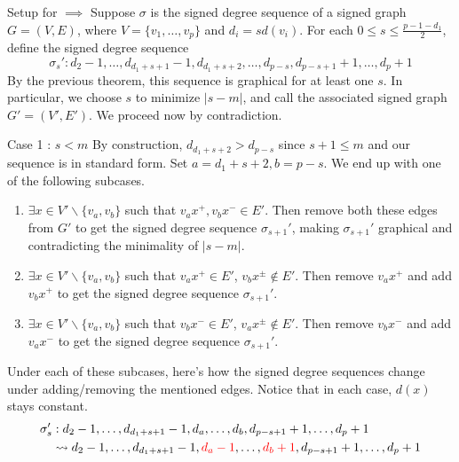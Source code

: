 \begin{frame}{Setup for $\implies$}
	Suppose $\sigma$ is the signed degree sequence of a signed graph $G = (V,E)$, where $V = \{v_1,\dots,v_p\}$ and $d_i = sd(v_i)$. For each $0 \leq s \leq \frac{p-1-d_1}{2}$, define the signed degree sequence
	\begin{equation*}
		\sigma_s' : d_2-1,\dots,d_{d_1+s+1}-1,d_{d_1+s+2},\dots,d_{p-s},d_{p-s+1}+1,\dots,d_p+1
	\end{equation*}
	By the previous theorem, this sequence is graphical for at least one $s$. In particular, we choose $s$ to minimize $|s-m|$, and call the associated signed graph $G' = (V',E')$. We proceed now by contradiction.
\end{frame}

\begin{frame}{Case 1 : $s < m$}
	By construction, $d_{d_1+s+2} > d_{p-s}$ since $s+1 \leq m$ and our sequence is in standard form. Set $a = d_1+s+2, b = p - s$. We end up with one of the following subcases.
	\begin{enumerate}
		\item $\exists x \in V'\backslash\{v_a,v_b\}$ such that $v_ax^{+}, v_bx^{-} \in E'$. Then remove both these edges from $G'$ to get the signed degree sequence $\sigma_{s+1}'$, making $\sigma_{s+1}'$ graphical and contradicting the minimality of $|s - m|$.
		\item $\exists x \in V'\backslash\{v_a,v_b\}$ such that $v_ax^{+} \in E'$, $v_bx^{\pm} \notin E'$. Then remove $v_ax^{+}$ and add $v_bx^{+}$ to get the signed degree sequence $\sigma_{s+1}'$.
		\item $\exists x \in V'\backslash\{v_a,v_b\}$ such that $v_bx^{-} \in E'$, $v_ax^{\pm} \notin E'$. Then remove $v_bx^{-}$ and add $v_ax^{-}$ to get the signed degree sequence $\sigma_{s+1}'$.
	\end{enumerate}
\end{frame}


\begin{frame}
	Under each of these subcases, here's how the signed degree sequences change under adding/removing the mentioned edges. Notice that in each case, $d(x)$ stays constant.
	\begin{align*}
		\sigma^\prime_s&: d_2-1, \dots, d_{d_1+s+1}-1, d_{a}, \dots, d_{b}, d_{p-s+1}+1, \dots, d_p+1 \\
			& \leadsto d_2-1, \dots, d_{d_1+s+1}-1, \color{red} d_{a} - 1 \color{black}, \dots, \color{red} d_{b} + 1 \color{black}, d_{p-s+1}+1, \dots, d_p+1
	\end{align*}
\end{frame}


